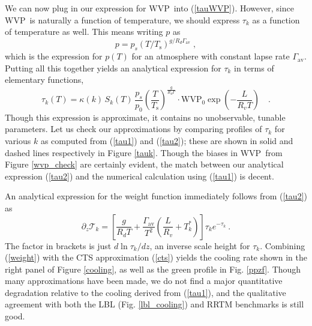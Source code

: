 \documentclass[10pt]{article}
\newcommand{\beqn}{\begin{equation}}
\newcommand{\eeqn}{\end{equation}}
\newcommand{\eqnref}[1]{(\ref{#1})}
\newcommand{\n}{\nonumber}
\newcommand{\ppz}{\ensuremath{\partial_z}}
\newcommand{\trans}{\ensuremath{\mathcal{T}}}
\newcommand{\Ts}{\ensuremath{T_\mathrm{s}}}
\newcommand{\ps}{\ensuremath{p_s}}
\newcommand{\WVP}{\ensuremath{\mathrm{WVP}}}
\newcommand{\gammaav}{\ensuremath{\Gamma_\mathrm{av}}}
\begin{document}
We can now plug in our  expression for \WVP\ into \eqnref{tauWVP}. However, since \WVP\ is naturally a function of temperature, we should express $\tau_k$ as a function of temperature as well. This means writing $p$ as 
	\beqn
		p=\ps(T/\Ts)^{g/R_d\gammaav} \; ,
	\n
	\eeqn 
	which is the expression for $p(T)$ for an atmosphere with constant lapse rate $\gammaav$. Putting all this together yields an  analytical expression for $\tau_k$ in terms of elementary functions,
	\beqn
		\tau_k(T) = \kappa(k)\, S_k(T)\, \frac{\ps}{p_0}\left(\frac{T}{\Ts}\right)^{\frac{g}{R_d\Gamma}}\cdot \WVP_0\exp\left(-\frac{L}{R_v T}\right) \quad .
	\label{tau2}
	\eeqn
Though this expression is approximate, it contains no unobservable, tunable parameters. Let us check our approximations by comparing profiles of $\tau_k$ for various $k$ as computed from \eqnref{tau1} and \eqnref{tau2}; these are shown in solid and dashed lines respectively in Figure \ref{tauk}.
Though the biases in \WVP\ from Figure \ref{wvp_check} are certainly evident, the match between our analytical expression \eqnref{tau2} and the numerical calculation using \eqnref{tau1} is decent.


An analytical expression for the weight function  immediately follows from \eqnref{tau2} as 
	\beqn
		\ppz \trans_k = \left[\frac{g}{R_d T} + \frac{ \gammaav}{ T^2}\left(\frac{L}{R_v} + T_k^*\right) \right] \tau_k e^{-\tau_k}  \ .
	\label{weight}
	\eeqn
 The factor  in brackets is just $d \ln \tau_k/dz$,  an inverse scale height for $\tau_k$. Combining \eqnref{weight}  with the CTS approximation \eqnref{cts}  yields the cooling rate shown in the right panel of Figure \ref{cooling}, as well as the green profile in Fig. \ref{ppzf}.  Though many approximations have been made, we do not find  a major quantitative degradation relative to the cooling derived from \eqnref{tau1}, and the qualitative agreement with both the LBL (Fig. \ref{lbl_cooling}) and RRTM benchmarks is still good.
\end{document}
